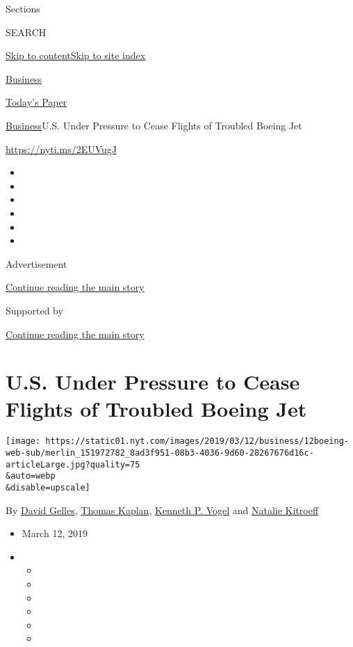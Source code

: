 Sections

SEARCH

\protect\hyperlink{site-content}{Skip to
content}\protect\hyperlink{site-index}{Skip to site index}

\href{https://www.nytimes.com/section/business}{Business}

\href{https://myaccount.nytimes.com/auth/login?response_type=cookie\&client_id=vi}{}

\href{https://www.nytimes.com/section/todayspaper}{Today's Paper}

\href{/section/business}{Business}\textbar{}U.S. Under Pressure to Cease
Flights of Troubled Boeing Jet

\url{https://nyti.ms/2EUVugJ}

\begin{itemize}
\item
\item
\item
\item
\item
\item
\end{itemize}

Advertisement

\protect\hyperlink{after-top}{Continue reading the main story}

Supported by

\protect\hyperlink{after-sponsor}{Continue reading the main story}

\hypertarget{us-under-pressure-to-cease-flights-of-troubled-boeing-jet}{%
\section{U.S. Under Pressure to Cease Flights of Troubled Boeing
Jet}\label{us-under-pressure-to-cease-flights-of-troubled-boeing-jet}}

\texttt{[image: https://static01.nyt.com/images/2019/03/12/business/12boeing-web-sub/merlin\_151972782\_8ad3f951-08b3-4036-9d60-28267676d16c-articleLarge.jpg?quality=75\\\&auto=webp\\\&disable=upscale]}

By \href{https://www.nytimes.com/by/david-gelles}{David Gelles},
\href{https://www.nytimes.com/by/thomas-kaplan}{Thomas Kaplan},
\href{https://www.nytimes.com/by/kenneth-p-vogel}{Kenneth P. Vogel} and
\href{https://www.nytimes.com/by/natalie-kitroeff}{Natalie Kitroeff}

\begin{itemize}
\item
  March 12, 2019
\item
  \begin{itemize}
  \item
  \item
  \item
  \item
  \item
  \item
  \end{itemize}
\end{itemize}

